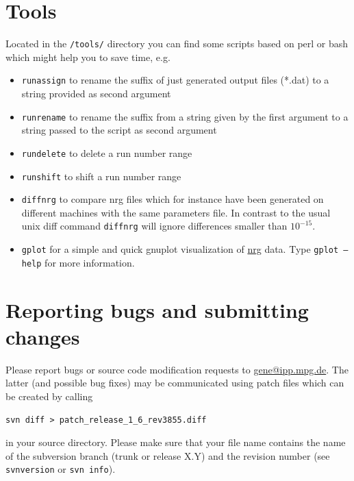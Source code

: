 \documentclass[12pt]{article}
\begin{document}
\section{Tools}
Located in the \texttt{/tools/} directory you can find some 
scripts based on perl or bash which might help you to save time, e.g.
\begin{itemize}
\item \texttt{runassign} to rename the suffix of just generated \gene output 
files (*.dat) to a string provided as second argument
\item \texttt{runrename} to rename the suffix from a string given by the
first argument to a string passed to the script as second argument
\item \texttt{rundelete} to delete a run number range
\item \texttt{runshift} to shift a run number range
\item \texttt{diffnrg} to compare nrg files which for instance 
 have been generated on different machines with the same parameters file.
In contrast to the usual unix diff command \texttt{diffnrg} will ignore
differences smaller than $10^{-15}$.
\item \texttt{gplot} for a simple and quick gnuplot visualization of 
\hyperref[subsec:nrg-file]{nrg} data. Type \texttt{gplot --help} for more 
information.
\end{itemize}

\newpage
\section{Reporting bugs and submitting changes}
Please report bugs or source code modification requests to 
\href{mailto:gene@ipp.mpg.de}{gene@ipp.mpg.de}.
The latter (and possible bug fixes) may be communicated using 
patch files which can be created by calling
\begin{verbatim}
svn diff > patch_release_1_6_rev3855.diff
\end{verbatim}
in your \gene source directory. Please make sure that your 
file name contains the name of the subversion branch (trunk or 
release X.Y) and the revision number (see \verb|svnversion| 
or \verb|svn info|).


\end{document}
